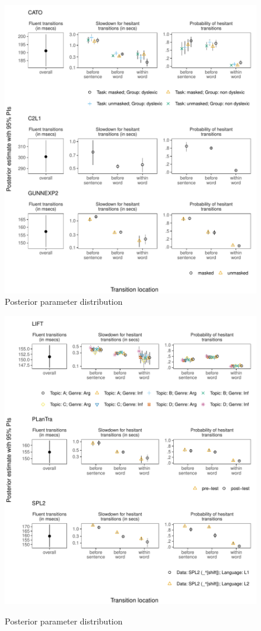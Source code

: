 \documentclass[
  man,floatsintext]{apa7}
\begin{document}
\begin{figure}[!htb]
\centering
\includegraphics{figures/psplots1constr.pdf}
\caption{Posterior parameter distribution}
\end{figure}
\newpage
\begin{figure}[!htb]
\ContinuedFloat
\captionsetup{list=off,format=cont}
\centering
\includegraphics{figures/psplots2constr.pdf}
\label{fig:fullps1}
\caption{Posterior parameter distribution}
\end{figure}
\end{document}
